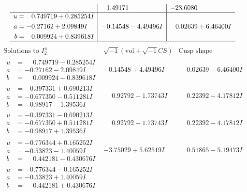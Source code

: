 \documentclass[1p]{elsarticle_modified}
\theoremstyle{definition}
\newcommand{\I}{\sqrt{-1}}
\begin{document}
$$\begin{array}{c|c|c}
 & \phantom{-}1.49171\phantom{ +0.000000I} & -23.6080\phantom{ +0.000000I} \\ \hline\begin{aligned}
u &= \phantom{-}0.749719 + 0.285254 I \\
a &= -0.27162 + 2.09849 I \\
b &= \phantom{-}0.009924 + 0.839618 I\end{aligned}
 & -0.14548 - 4.49496 I & \phantom{-}0.02639 + 6.46400 I\\
 \hline 
 \end{array}$$\newpage$$\begin{array}{c|c|c}  
\text{Solutions to }I^u_{2}& \I (\text{vol} + \sqrt{-1}CS) & \text{Cusp shape}\\
 \hline 
\begin{aligned}
u &= \phantom{-}0.749719 - 0.285254 I \\
a &= -0.27162 - 2.09849 I \\
b &= \phantom{-}0.009924 - 0.839618 I\end{aligned}
 & -0.14548 + 4.49496 I & \phantom{-}0.02639 - 6.46400 I \\ \hline\begin{aligned}
u &= -0.397331 + 0.690213 I \\
a &= -0.677350 - 0.511281 I \\
b &= -0.98917 - 1.39536 I\end{aligned}
 & \phantom{-}0.92792 + 1.73743 I & \phantom{-}0.22392 + 4.17812 I \\ \hline\begin{aligned}
u &= -0.397331 - 0.690213 I \\
a &= -0.677350 + 0.511281 I \\
b &= -0.98917 + 1.39536 I\end{aligned}
 & \phantom{-}0.92792 - 1.73743 I & \phantom{-}0.22392 - 4.17812 I \\ \hline\begin{aligned}
u &= -0.776344 + 0.165252 I \\
a &= -0.53823 - 1.40059 I \\
b &= \phantom{-}0.442181 - 0.430676 I\end{aligned}
 & -3.75029 + 5.62519 I & \phantom{-}0.51865 - 5.19473 I \\ \hline\begin{aligned}
u &= -0.776344 - 0.165252 I \\
a &= -0.53823 + 1.40059 I \\
b &= \phantom{-}0.442181 + 0.430676 I\end{aligned}

\end{array}$$
\end{document}
